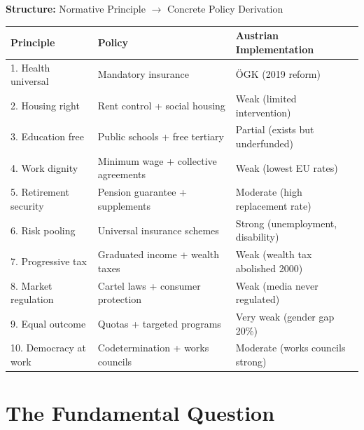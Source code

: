 \begin{tcolorbox}[colback=yellow!5!white, colframe=yellow!75!black,
    title=Quick Reference: The Ten Principles]

\textbf{Structure:} Normative Principle $\rightarrow$ Concrete Policy Derivation

\begin{table}[h]
\centering
\small
\renewcommand{\arraystretch}{1.2}
\begin{tabular}{@{}lll@{}}
\textbf{Principle} & \textbf{Policy} & \textbf{Austrian Implementation} \\
\midrule
1. Health universal & Mandatory insurance & ÖGK (2019 reform) \\
2. Housing right & Rent control + social housing & Weak (limited intervention) \\
3. Education free & Public schools + free tertiary & Partial (exists but underfunded) \\
4. Work dignity & Minimum wage + collective agreements & Weak (lowest EU rates) \\
5. Retirement security & Pension guarantee + supplements & Moderate (high replacement rate) \\
6. Risk pooling & Universal insurance schemes & Strong (unemployment, disability) \\
7. Progressive tax & Graduated income + wealth taxes & Weak (wealth tax abolished 2000) \\
8. Market regulation & Cartel laws + consumer protection & Weak (media never regulated) \\
9. Equal outcome & Quotas + targeted programs & Very weak (gender gap 20\%) \\
10. Democracy at work & Codetermination + works councils & Moderate (works councils strong) \\
\end{tabular}
\end{table}

\end{tcolorbox}


\section{The Fundamental Question}
\label{sec:bf-fundamental}

